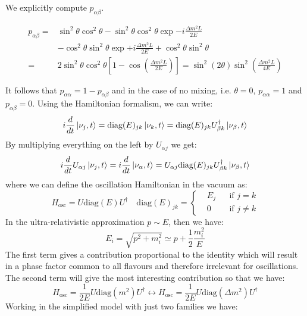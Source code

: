 \documentclass[10.75pt,a4paper,openright,bottom=2cm]{article}
\newcommand{\beginbox}[1]{\begin{tcolorbox}[width=\textwidth,colback={black!40},title={#1},colbacktitle={purple!55},coltitle=black]}
\renewcommand{\endbox}{\end{tcolorbox}\noindent}
\begin{document}
We explicitly compute $p_{\alpha\beta}$.
\beginbox{Oscillation Probability in the Vacuum}
\begin{align*}
p_{\alpha\beta}=&\sin^2\theta\cos^2\theta-\sin^2\theta\cos^2\theta\exp{-i\frac{\Delta m^2L}{2E}}\\
&-\cos^2\theta\sin^2\theta\exp{+i\frac{\Delta m^2L}{2E}}+\cos^2\theta\sin^2\theta\\
=&2\sin^2\theta\cos^2\theta\left[1-\cos\left(\frac{\Delta m^2L}{2E}\right)\right]=\sin^2(2\theta)\sin^2\left(\frac{\Delta m^2L}{4E}\right)
\end{align*}
\endbox
It follows that $p_{\alpha\alpha}=1-p_{\alpha\beta}$ and in the case of no mixing, i.e. $\theta=0$, $p_{\alpha\alpha}=1$ and $p_{\alpha\beta}=0$.
Using the Hamiltonian formalism, we can write:
\[
i\frac{d}{dt}\ket{\nu_j,t}=\text{diag}(E)_{jk}\ket{\nu_k,t}=\text{diag}(E)_{jk}U^\dagger_{\beta k}\ket{\nu_\beta,t}
\]
By multiplying everything on the left by $U_{\alpha j}$ we get:
\[
i\frac{d}{dt}U_{\alpha j}\ket{\nu_j,t}=i\frac{d}{dt}\ket{\nu_\alpha,t}=U_{\alpha j}\text{diag}(E)_{jk}U^\dagger_{\beta k}\ket{\nu_\beta,t}
\]
where we can define the oscillation Hamiltonian in the vacuum as:
\[
H_{\text{osc}}=U\text{diag}(E)U^\dagger \quad \text{diag}(E)_{jk}=\left\{\begin{aligned}
&E_j &&\text{if $j=k$}\\
&0 &&\text{if $j\neq k$} 
\end{aligned}
\right.
\]
In the ultra-relativistic approximation $p\sim E$, then we have:
\[
E_i=\sqrt{p^2+m_i^2}\simeq p+\frac{1}{2}\frac{m_i^2}{E}
\]
The first term gives a contribution proportional to the identity which will result in a phase factor common to all flavours and therefore irrelevant for oscillations. The second term will give the most interesting contribution so that we have:
\[
H_{\text{osc}}=\frac{1}{2E}U\text{diag}(m^2)U^\dagger\longleftrightarrow H_{\text{osc}}=\frac{1}{2E}U\text{diag}(\Delta m^2)U^\dagger
\]
Working in the simplified model with just two families we have:
\end{document}
